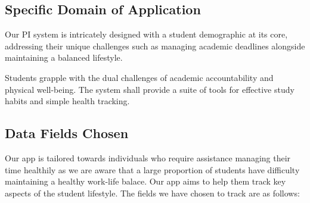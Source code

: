 \documentclass[12pt]{article}
\begin{document}
\subsection{Specific Domain of Application}

Our PI system is intricately designed with a student demographic at its core,
addressing their unique challenges such as managing academic deadlines
alongside maintaining a balanced lifestyle.\par 

Students grapple with the dual challenges of academic accountability and
physical well-being. The system shall provide a suite of tools for effective
study habits and simple health tracking.
 

\subsection{Data Fields Chosen}

Our app is tailored towards individuals who require assistance managing their time healthily as
we are aware that a large proportion of students have difficulty maintaining a healthy work-life
balace. Our app aims to help them track key aspects of the student lifestyle.
The fields we have chosen to track are as follows:
\end{document}
